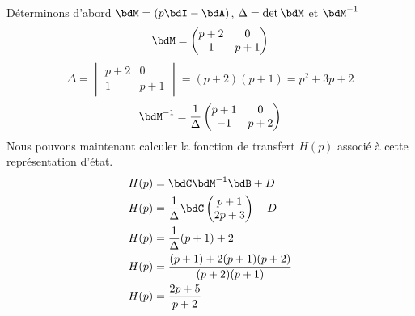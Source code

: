Déterminons d'abord $\bdM=(p\bdI-\bdA)$, $\Delta=\det{\bdM}$ et $\bdM^{-1}$
\[
    \bdM=
    \begin{pmatrix} 
        p+2 & 0\\
        1 & p+1 
    \end{pmatrix}
\]
\[
    \Delta=
    \begin{vmatrix} 
        p+2 & 0\\
        1 & p+1 
    \end{vmatrix}=(p+2)(p+1)=p^2+3p+2
\]
\[
    \bdM^{-1}=
    \dfrac{1}{\Delta}
    \begin{pmatrix} 
        p+1 & 0\\
        -1 & p+2 
    \end{pmatrix}
\]
Nous pouvons maintenant calculer la fonction de transfert $H(p)$ associé à
cette représentation d'état.
\begin{align*}
    H(p)&=\bdC\bdM^{-1}\bdB+D\\
    H(p)&=\dfrac{1}{\Delta}\bdC\begin{pmatrix}p+1\\2p+3\end{pmatrix}+D\\
    H(p)&=\dfrac{1}{\Delta}(p+1)+2\\
    H(p)&=\dfrac{(p+1)+2(p+1)(p+2)}{(p+2)(p+1)}\\
    H(p)&=\dfrac{2p+5}{p+2}
\end{align*}
